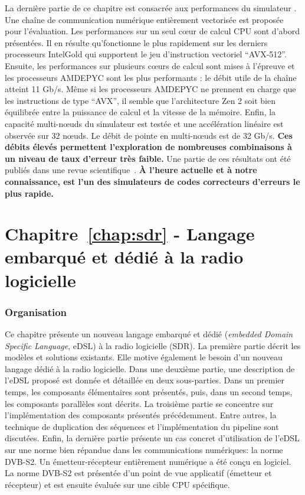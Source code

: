 La dernière partie de ce chapitre est consacrée aux performances du simulateur
\AFFECT. Une chaîne de communication numérique entièrement vectorisée est
proposée pour l'évaluation. Les performances sur un seul cœur de calcul CPU sont
d'abord présentées. Il en résulte qu'\AFFECT fonctionne le plus rapidement sur
les derniers processeurs Intel\R Gold qui supportent le jeu d'instruction
vectoriel ``AVX-512''. Ensuite, les performances sur plusieurs cœurs de calcul
sont mises à l'épreuve et les processeurs AMD\R EPYC sont les plus performants :
le débit utile de la chaîne atteint 11 Gb/s. Même si les processeurs AMD\R EPYC
ne prennent en charge que les instructions de type ``AVX'', il semble que
l'architecture Zen 2 soit bien équilibrée entre la puissance de calcul et la
vitesse de la mémoire. Enfin, la capacité multi-nœuds du simulateur \AFFECT est
testée et une accélération linéaire est observée sur 32 nœuds. Le débit de
pointe en multi-nœuds est de 32 Gb/s. \textbf{Ces débits élevés permettent
l'exploration de nombreuses combinaisons à un niveau de taux d'erreur très
faible.} Une partie de ces résultats ont été publiés dans une revue
scientifique~\cite{Cassagne2019a}. \textbf{À l'heure actuelle et à notre
connaissance, \AFFECT est l'un des simulateurs de codes correcteurs d'erreurs
le plus rapide.}

\section*{Chapitre~\ref{chap:sdr} - Langage embarqué et dédié à la radio logicielle}

\subsubsection*{Organisation}

Ce chapitre présente un nouveau langage embarqué et dédié (\emph{embedded Domain
Specific Language}, eDSL) à la radio logicielle (SDR). La première partie
décrit les modèles et solutions existants. Elle motive également le besoin
d'un nouveau langage dédié à la radio logicielle. Dans une deuxième partie, une
description de l'eDSL proposé est donnée et détaillée en deux sous-parties. Dans
un premier temps, les composants élémentaires sont présentés, puis, dans un
second temps, les composants parallèles sont décrits. La troisième partie se
concentre sur l'implémentation des composants présentés précédemment. Entre
autres, la technique de duplication des séquences et l'implémentation du
pipeline sont discutées. Enfin, la dernière partie présente un cas concret
d'utilisation de l'eDSL sur une norme bien répandue dans les communications
numériques: la norme DVB-S2. Un émetteur-récepteur entièrement numérique a été
conçu en logiciel. La norme DVB-S2 est présentée d'un point de vue applicatif
(émetteur et récepteur) et est ensuite évaluée sur une cible CPU spécifique.

